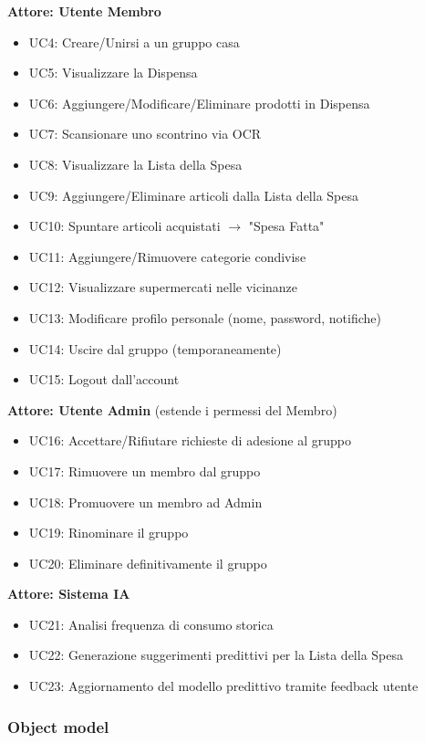 \documentclass[12pt,a4paper]{article}
\begin{document}
\textbf{Attore: Utente Membro}
\begin{itemize}
    \item UC4: Creare/Unirsi a un gruppo casa
    \item UC5: Visualizzare la Dispensa
    \item UC6: Aggiungere/Modificare/Eliminare prodotti in Dispensa
    \item UC7: Scansionare uno scontrino via OCR
    \item UC8: Visualizzare la Lista della Spesa
    \item UC9: Aggiungere/Eliminare articoli dalla Lista della Spesa
    \item UC10: Spuntare articoli acquistati $\rightarrow$ "Spesa Fatta"
    \item UC11: Aggiungere/Rimuovere categorie condivise
    \item UC12: Visualizzare supermercati nelle vicinanze
    \item UC13: Modificare profilo personale (nome, password, notifiche)
    \item UC14: Uscire dal gruppo (temporaneamente)
    \item UC15: Logout dall'account
\end{itemize}

\textbf{Attore: Utente Admin} (estende i permessi del Membro)
\begin{itemize}
    \item UC16: Accettare/Rifiutare richieste di adesione al gruppo
    \item UC17: Rimuovere un membro dal gruppo
    \item UC18: Promuovere un membro ad Admin
    \item UC19: Rinominare il gruppo
    \item UC20: Eliminare definitivamente il gruppo
\end{itemize}

\textbf{Attore: Sistema IA}
\begin{itemize}
    \item UC21: Analisi frequenza di consumo storica
    \item UC22: Generazione suggerimenti predittivi per la Lista della Spesa
    \item UC23: Aggiornamento del modello predittivo tramite feedback utente
\end{itemize}

\subsubsection{Object model}
\end{document}
